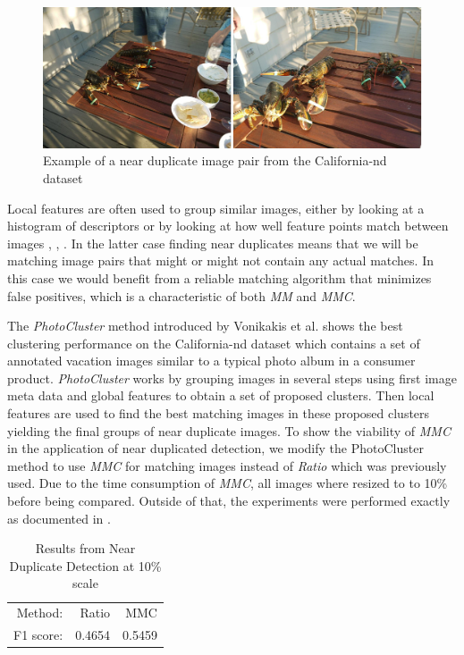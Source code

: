 \begin{figure}[h]
	\includegraphics[width=\textwidth]{images/near_duplicate_example}
	\caption{Example of a near duplicate image pair from the 
	California-nd dataset \cite{jinda2012california}}
	\label{fig:near_duplicate}
\end{figure}

Local features are often used to group similar images, either by looking
at a histogram of descriptors \cite{wu2009bundling} or by looking at how
well feature points match between images \cite{zhao2009scale},
\cite{chu2010consumer}, \cite{vas2013cluster}. In the latter case 
finding near duplicates means that we will be matching image pairs that 
might or might not contain any actual matches. In this case we would 
benefit from a reliable matching algorithm that minimizes false 
positives, which is a characteristic of both \emph{MM} and \emph{MMC}.

The \emph{PhotoCluster} method introduced by Vonikakis et al.  
\cite{vas2013cluster} shows the best clustering performance on the 
California-nd dataset \cite{jinda2012california} which contains a set of
annotated vacation images similar to a typical photo album in a consumer
product. \emph{PhotoCluster} works by grouping images in several steps 
using first image meta data and global features to obtain a set of 
proposed clusters. Then local features are used to find the best 
matching images in these proposed clusters yielding the final groups of 
near duplicate images. To show the viability of \emph{MMC} in the 
application of near duplicated detection, we modify the PhotoCluster 
method to use \emph{MMC} for matching images instead of \emph{Ratio} 
which was previously used. Due to the time consumption of \emph{MMC}, 
all images where resized to to 10\% before being compared. Outside of 
that, the experiments were performed exactly as documented in 
\cite{vas2013cluster}.

\begin{table}[htb]
\caption{Results from Near Duplicate Detection at 10\% scale}
\label{table:ndd}
	\centering
\begin{tabular}{r*{2}{r}}
\hline
    Method: & Ratio & MMC   \\
	\noalign{\smallskip}
    F1 score: & 0.4654 & 0.5459 \\
	\hline
\end{tabular}
\end{table}

